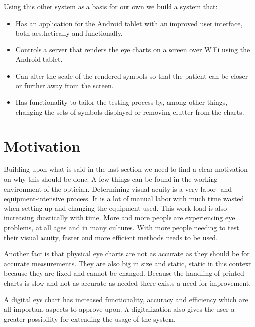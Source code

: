 \documentclass[12pt,a4paper,notitlepage]{report}
\begin{document}
Using this other system as a basis for our own we build a system that:

\begin{itemize}
	\item Has an application for the Android tablet with an improved user interface, both aesthetically and functionally.
	\item Controls a server that renders the eye charts on a screen over WiFi using the Android tablet.
	\item Can alter the scale of the rendered symbols so that the patient can be closer or further away from the screen.
	\item Has functionality to tailor the testing process by, among other things, changing the sets of symbols displayed or removing clutter from the charts.
\end{itemize}

\section{Motivation}
Building upon what is said in the last section we need to find a clear motivation on why this should be done. A few things can be found in the working environment of the optician. Determining visual acuity is a very labor- and equipment-intensive process. It is a lot of manual labor with much time wasted when setting up and changing the equipment used. This work-load is also increasing drastically with time. More and more people are experiencing eye problems, at all ages and in many cultures. \cite{vision_loss} With more people needing to test their visual acuity, faster and more efficient methods needs to be used. 

Another fact is that physical eye charts are not as accurate as they should be for accurate measurements. They are also big in size and static, static in this context because they are fixed and cannot be changed. Because the handling of printed charts is slow and not as accurate as needed there exists a need for improvement. 

A digital eye chart has increased functionality, accuracy and efficiency which are all important aspects to approve upon. A digitalization also gives the user a greater possibility for extending the usage of the system.
\end{document}
